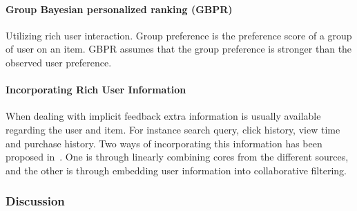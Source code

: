 \paragraph{Group Bayesian personalized ranking (GBPR)~\cite{Pan:2013:GGP:2540128.2540516}}

Utilizing rich user interaction.  Group preference is the preference score of a
group of user on an item.  GBPR assumes that the group preference is stronger
than the observed user preference.

\paragraph{Incorporating Rich User Information~\cite{deLace2010,Li2013}}

When dealing with implicit feedback extra information is usually available
regarding the user and item.  For instance search query, click history, view
time and purchase history.  Two ways of incorporating this information has been
proposed in~\cite{deLace2010}.  One is through linearly combining cores from
the different sources, and the other is through embedding user information into
collaborative filtering.

\subsubsection{Discussion}
